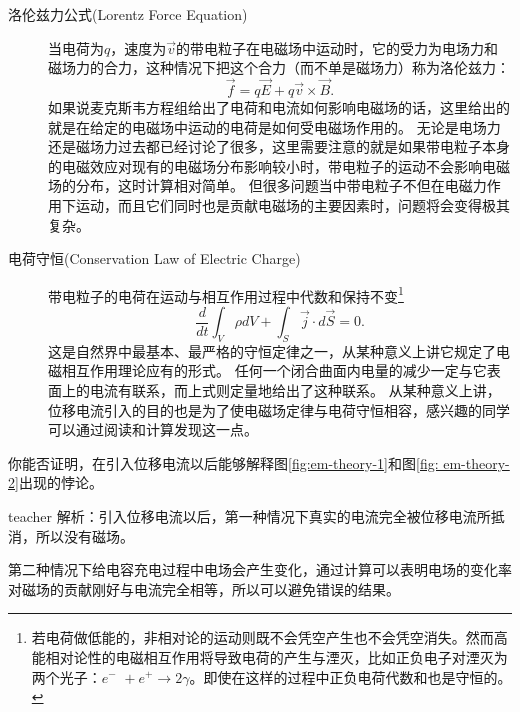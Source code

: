 \begin{description}
\item[{\heiti 洛伦兹力公式}(Lorentz Force Equation)]
当电荷为$q$，速度为$\vec{v}$的带电粒子在电磁场中运动时，它的受力为电场力和磁场力的合力，这种情况下把这个合力（而不单是磁场力）称为洛伦兹力：
\begin{equation}
\vec{f} = q\vec{E}+q\vec{v}\times\vec{B}.
\end{equation}\label{eqn: 洛伦兹力}
如果说麦克斯韦方程组给出了电荷和电流如何影响电磁场的话，这里给出的就是在给定的电磁场中运动的电荷是如何受电磁场作用的。
无论是电场力还是磁场力过去都已经讨论了很多，这里需要注意的就是如果带电粒子本身的电磁效应对现有的电磁场分布影响较小时，带电粒子的运动不会影响电磁场的分布，这时计算相对简单。
但很多问题当中带电粒子不但在电磁力作用下运动，而且它们同时也是贡献电磁场的主要因素时，问题将会变得极其复杂。
\item[{\heiti 电荷守恒}(Conservation Law of Electric Charge)]
带电粒子的电荷在运动与相互作用过程中代数和保持不变\footnote{若电荷做低能的，非相对论的运动则既不会凭空产生也不会凭空消失。然而高能相对论性的电磁相互作用将导致电荷的产生与湮灭，比如正负电子对湮灭为两个光子：$e^- \,\, + e^+ \longrightarrow 2\gamma$。即使在这样的过程中正负电荷代数和也是守恒的。}
\begin{equation}
\frac{d}{dt}\int_V\rho dV+\int_S \vec{j}\cdot d\vec{S} = 0.
 \end{equation}
这是自然界中最基本、最严格的守恒定律之一，从某种意义上讲它规定了电磁相互作用理论应有的形式。
任何一个闭合曲面内电量的减少一定与它表面上的电流有联系，而上式则定量地给出了这种联系。
从某种意义上讲，位移电流引入的目的也是为了使电磁场定律与电荷守恒相容，感兴趣的同学可以通过阅读和计算发现这一点。



\end{description}



\begin{example}
你能否证明，在引入位移电流以后能够解释图\ref{fig:em-theory-1}和图\ref{fig: em-theory-2}出现的悖论。
\begin{taggedblock}{teacher}
\noindent
解析：引入位移电流以后，第一种情况下真实的电流完全被位移电流所抵消，所以没有磁场。

第二种情况下给电容充电过程中电场会产生变化，通过计算可以表明电场的变化率对磁场的贡献刚好与电流完全相等，所以可以避免错误的结果。
\end{taggedblock}
\end{example}




